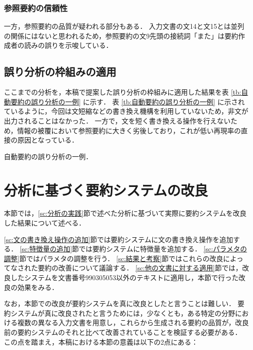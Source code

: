 \subsubsection{参照要約の信頼性}

一方，参照要約の品質が疑われる部分もある．
入力文書の文14と文15とは並列の関係にはないと思われるため，参照要約の文9先頭の接続詞「また」は要約作成者の読みの誤りを示唆している．


\subsection{誤り分析の枠組みの適用}

ここまでの分析を，本稿で提案した誤り分析の枠組みに適用した結果を表 \ref{tb:自動要約の誤り分析の一例} に示す．
表 \ref{tb:自動要約の誤り分析の一例} に示されているように，今回は文短縮などの書き換え機構を利用していないため，非文が出力されることはなかった．
一方で，文を短く書き換える操作を行えないため，情報の被覆において参照要約に大きく劣後しており，これが低い再現率の直接の原因となっている．

\begin{table}[t]
\caption{自動要約の誤り分析の一例．}
\label{tb:自動要約の誤り分析の一例}

\end{table}


\section{分析に基づく要約システムの改良}
\label{sc:分析に基づく要約システムの改良}

本節では，\ref{sc:分析の実践}節で述べた分析に基づいて実際に要約システムを改良した結果について述べる．

\ref{sc:文の書き換え操作の追加}節では要約システムに文の書き換え操作を追加する．
\ref{sc:特徴量の追加}節では要約システムに特徴量を追加する．
\ref{sc:パラメタの調整}節ではパラメタの調整を行う．
\ref{sc:結果と考察}節ではこれらの改良によってなされた要約の改善について議論する．
\ref{sc:他の文書に対する適用}節では，改良したシステムを文書番号990305053以外のテキストに適用し，本節で行った改良の効果をみる．

なお，本節での改良が要約システムを真に改良としたと言うことは難しい．
要約システムが真に改良されたと言うためには，少なくとも，ある特定の分野における複数の異なる入力文書を用意し，これらから生成される要約の品質が，改良前の要約システムのそれと比べて改善されていることを検証する必要がある．
この点を踏まえ，本稿における本節の意義は以下の2点にある：

